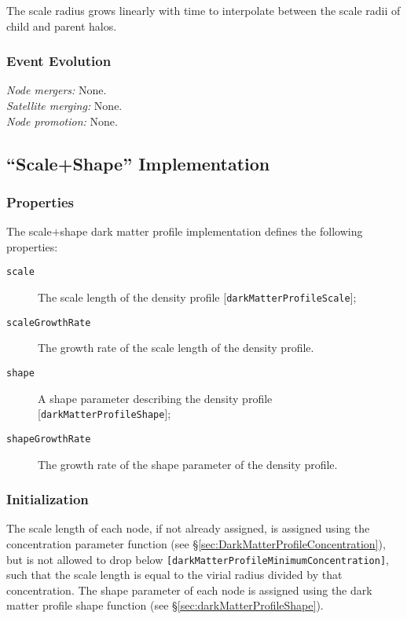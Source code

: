 The scale radius grows linearly with time to interpolate between the scale radii of child and parent halos.

\subsubsection{Event Evolution}

\noindent\emph{Node mergers:} None.\\

\noindent\emph{Satellite merging:} None.\\

\noindent\emph{Node promotion:} None.\\

\subsection{``Scale+Shape'' Implementation}\label{sec:DarkMatterProfileScaleShape}

\subsubsection{Properties}

The scale$+$shape dark matter profile implementation defines the following properties:
\begin{description}
 \item [{\tt scale}] The scale length of the density profile [{\tt darkMatterProfileScale}];
 \item [{\tt scaleGrowthRate}] The growth rate of the scale length of the density profile.
 \item [{\tt shape}] A shape parameter describing the density profile [{\tt darkMatterProfileShape}];
 \item [{\tt shapeGrowthRate}] The growth rate of the shape parameter of the density profile.
\end{description}

\subsubsection{Initialization}

The scale length of each node, if not already assigned, is assigned using the concentration parameter function (see \S\ref{sec:DarkMatterProfileConcentration}), but is not allowed to drop below {\tt [darkMatterProfileMinimumConcentration]}, such that the scale length is equal to the virial radius divided by that concentration. The shape parameter of each \gls{node} is assigned using the dark matter profile shape function (see \S\ref{sec:darkMatterProfileShape}).

